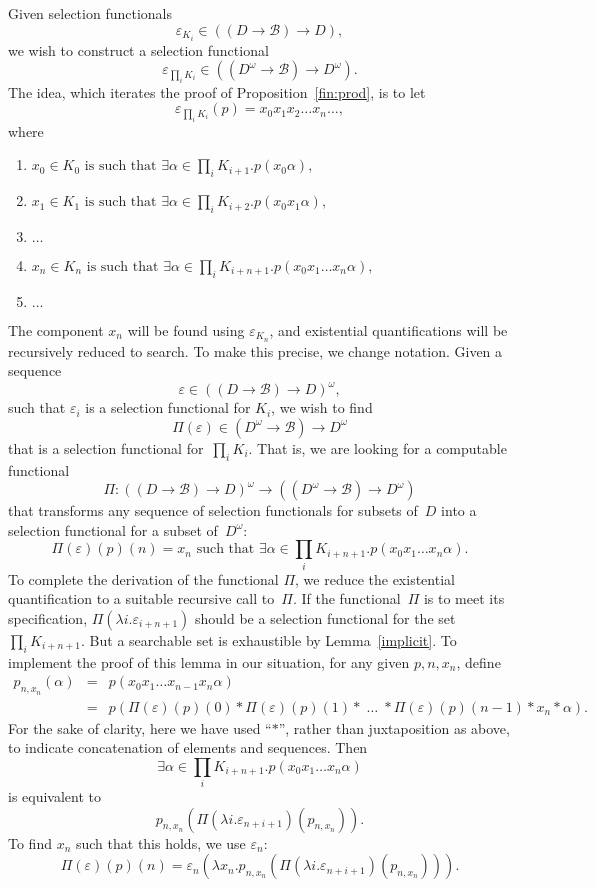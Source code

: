 \documentclass{LMCS}
\newcommand{\e}{\varepsilon}
\newcommand{\myomega}{\omega}
\newcommand{\licsmath}[1]{\[ #1 \]}
\newcommand{\licsmathtttt}[5]{\begin{enumerate}
\item[] \quad $#1$
\item[] \quad $#2$
\item[] \quad $#3$
\item[] \quad $#4$
\item[] \quad $#5$
\end{enumerate}}
\newcommand{\pBool}{\mathcal{B}}
\newcommand{\D}{D}
\begin{document}
\pagebreak[3]
Given selection functionals
\licsmath{\e_{K_i} \in ((\D \to \pBool) \to \D),}
we wish to construct a selection functional 
\licsmath{\text{$\e_{\prod_i K_i} \in ((\D^\myomega \to \pBool)
    \to \D^\myomega)$}.}  
The idea, which iterates the proof of Proposition~\ref{fin:prod}, is to
let
\licsmath{\e_{\prod_i K_i}(p)=x_0x_1x_2\dots x_n\dots,}
where
\licsmathtttt{\text{$x_0 \in K_0$ is such that $\exists \alpha \in \prod_{i} K_{i+1}.p(x_0\alpha)$,}}
{\text{$x_1 \in K_1$ is such that  $\exists \alpha \in \prod_{i} K_{i+2}.p(x_0x_1\alpha)$,}}
{\dots}{\text{$x_n \in K_n$ is such that $\exists \alpha\in \prod_{i} K_{i+n+1}.p(x_0x_1\dots x_n\alpha)$,}}
{\dots}The component $x_n$ will be found using $\e_{K_n}$, and
existential quantifications will be recursively reduced to search.  To
make this precise, we change notation.  Given a sequence
\licsmath{\e \in ((\D \to \pBool) \to \D)^\myomega,}
such that $\e_i$ is a selection functional for $K_i$, we wish
to find
\licsmath{\Pi(\e) \in (\D^\myomega \to \pBool) \to \D^\myomega}
that is a selection functional for~$\prod_i K_i$. That is, we are
looking for a computable functional
\licsmath{\Pi \colon ((\D \to
  \pBool) \to \D)^\myomega \to ((\D^\myomega \to \pBool) \to \D^\myomega)}
that transforms any sequence of selection functionals for subsets
of~$\D$ into a selection functional for a subset of~$\D^\myomega$:
\licsmath{\Pi(\e)(p)(n) = \text{$x_n$ such that\ $\exists \alpha\in \prod_{i} K_{i+n+1}.p(x_0x_1\dots x_n\alpha)$.}}
To complete the derivation of the functional $\Pi$, we reduce the
existential quantification to a suitable recursive call to~$\Pi$.  If
the functional~$\Pi$ is to meet its specification, $\Pi(\lambda
i.\e_{i+n+1})$ should be a selection functional for the
set~$\prod_{i} K_{i+n+1}$. But a searchable set is exhaustible by
Lemma~\ref{implicit}. To implement the proof of this lemma in our
situation, for any given $p,n,x_n$, define
\begin{eqnarray*}
p_{n,x_n}(\alpha)& = & p(x_0x_1\dots x_{n-1} x_{n}\alpha) \\
& = & p(\Pi(\e)(p)(0) * \Pi(\e)(p)(1) * \operatorname{\dots} * \Pi(\e)(p)(n-1) * x_n * \alpha).
\end{eqnarray*}
For the sake of clarity, here we have used ``$*$'', rather than
juxtaposition as above, to indicate concatenation of
elements and sequences.  Then
\licsmath{\exists \alpha\in \prod_{i} K_{i+n+1}.p(x_0x_1\dots x_n\alpha)}
is equivalent to
\licsmath{p_{n,x_n}(\Pi(\lambda i.\e_{n+i+1})(p_{n,x_n})).}
To find $x_n$ such that this holds, we use $\e_n$:
\licsmath{\Pi(\e)(p)(n) = \e_n(\lambda
  x_n.p_{n,x_n}(\Pi(\lambda i.\e_{n+i+1})(p_{n,x_n}))).}
\end{document}
